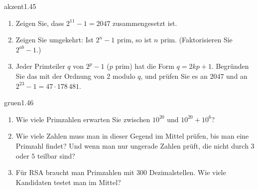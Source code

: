 \begin{karte}{akzent}{1.45}{\typstolper}{}
\begin{enumerate}[label=(\alph*),leftmargin=1.6em,itemsep=2pt]
\item Zeigen Sie, dass $2^{11} - 1 = 2047$ zusammengesetzt ist.
\item Zeigen Sie umgekehrt: Ist $2^{n} - 1$ prim, so ist $n$ prim. (Faktorisieren Sie $2^{ab} - 1$.)
\item Jeder Primteiler $q$ von $2^{p} - 1$ ($p$ prim) hat die Form $q = 2kp + 1$. Begründen Sie das mit der Ordnung von $2$ modulo $q$, und prüfen Sie es an $2047$ und an $2^{23} - 1 = 47\cdot178\,481$.
\end{enumerate}
\end{karte}

\begin{karte}{gruen}{1.46}{\typwerk}{}
\begin{enumerate}[label=(\alph*),leftmargin=1.6em,itemsep=2pt]
\item Wie viele Primzahlen erwarten Sie zwischen $10^{20}$ und $10^{20} + 10^{6}$?
\item Wie viele Zahlen muss man in dieser Gegend im Mittel prüfen, bis man eine Primzahl findet? Und wenn man nur ungerade Zahlen prüft, die nicht durch $3$ oder $5$ teilbar sind?
\item Für RSA braucht man Primzahlen mit $300$ Dezimalstellen. Wie viele Kandidaten testet man im Mittel?
\end{enumerate}
\end{karte}

